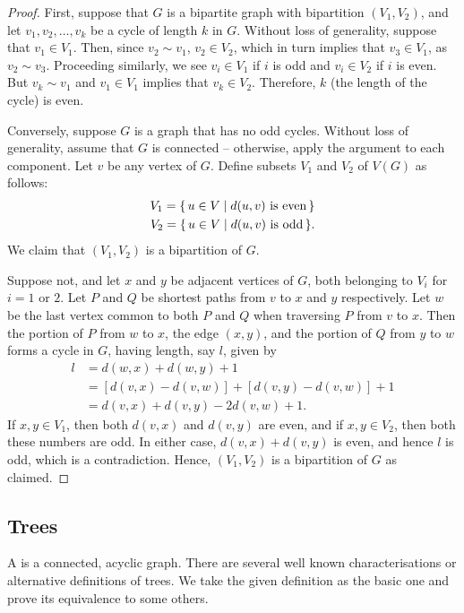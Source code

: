\begin{proof}
First, suppose that $G$ is a bipartite graph with bipartition $(V_1, V_2)$, and let $v_1, v_2, \ldots, v_k$ be a cycle of length $k$ in $G$. Without loss of generality, suppose that $v_1 \in V_1$. Then, since $v_2 \sim v_1$, $v_2 \in V_2$, which in turn implies that $v_3 \in V_1$, as $v_2 \sim v_3$. Proceeding similarly, we see $v_i \in V_1$ if $i$ is odd and $v_i \in V_2$ if $i$ is even. But $v_k \sim v_1$ and $v_1 \in V_1$ implies that $v_k \in V_2$. Therefore, $k$ (the length of the cycle) is even.

Conversely, suppose $G$ is a graph that has no odd cycles. Without loss of generality, assume that $G$ is connected -- otherwise, apply the argument to each component. Let $v$ be any vertex of $G$. Define subsets $V_1$ and $V_2$ of $V(G)$ as follows:
\begin{align*}
    V_1 = \qty{\, u \in V \mid d(u, v)\ \text{is even} \,} \\
    V_2 = \qty{\, u \in V \mid d(u, v)\ \text{is odd} \,}.
\end{align*}
We claim that $(V_1, V_2)$ is a bipartition of $G$.

Suppose not, and let $x$ and $y$ be adjacent vertices of $G$, both belonging to $V_i$ for $i = 1$ or $2$. Let $P$ and $Q$ be shortest paths from $v$ to $x$ and $y$ respectively. Let $w$ be the last vertex common to both $P$ and $Q$ when traversing $P$ from $v$ to $x$. Then the portion of $P$ from $w$ to $x$, the edge $(x, y)$, and the portion of $Q$ from $y$ to $w$ forms a cycle in $G$, having length, say $l$, given by
\begin{align*}
l & = d(w, x) + d(w, y) + 1 \\
& = [d(v, x) - d(v, w)] + [d(v, y) - d(v, w)] + 1 \\
& = d(v, x) + d(v, y) - 2 d(v, w) + 1.
\end{align*}
If $x, y \in V_1$, then both $d(v, x)$ and $d(v, y)$ are even, and if $x, y \in V_2$, then both these numbers are odd. In either case, $d(v, x) + d(v, y)$ is even, and hence $l$ is odd, which is a contradiction. Hence, $(V_1, V_2)$ is a bipartition of $G$ as claimed.
\end{proof}

\subsection{Trees}\label{subsec:Trees}

A  is a connected, acyclic graph. There are several well known characterisations or alternative definitions of trees. We take the given definition as the basic one and prove its equivalence to some others.


